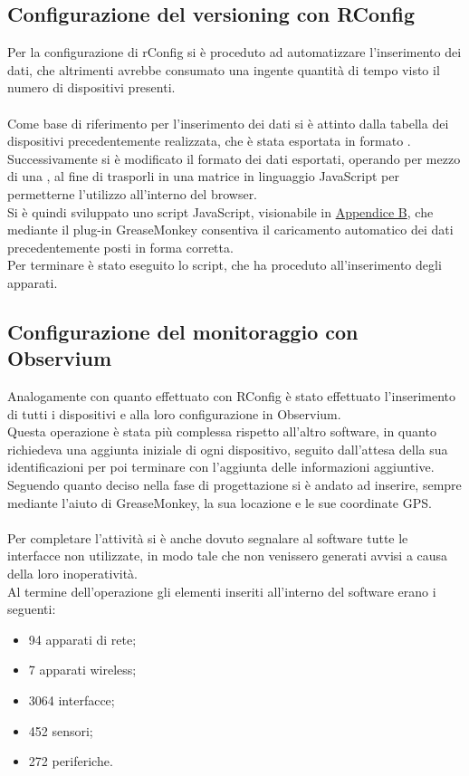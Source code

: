 \documentclass[Realizzazione.tex]{subfiles}
\begin{document}
\subsection{Configurazione del versioning con RConfig}
Per la configurazione di rConfig si è proceduto ad automatizzare l'inserimento dei dati, che altrimenti avrebbe consumato una ingente quantità di tempo visto il numero di dispositivi presenti. \\\\
Come base di riferimento per l'inserimento dei dati si è attinto dalla tabella dei dispositivi precedentemente realizzata, che è stata esportata in formato .\\
Successivamente si è modificato il formato dei dati esportati, operando per mezzo di una , al fine di trasporli in una matrice in linguaggio JavaScript per permetterne l'utilizzo all'interno del browser. \\
Si è quindi sviluppato uno script JavaScript, visionabile in \hyperref[sec:Appendice B]{Appendice B}, che mediante il plug-in GreaseMonkey consentiva il caricamento automatico dei dati precedentemente posti in forma corretta. \\
Per terminare è stato eseguito lo script, che ha proceduto all'inserimento degli apparati. \\


\subsection{Configurazione del monitoraggio con Observium}
Analogamente con quanto effettuato con RConfig è stato effettuato l'inserimento di tutti i dispositivi e alla loro configurazione in Observium. \\
Questa operazione è stata più complessa rispetto all'altro software, in quanto richiedeva una aggiunta iniziale di ogni dispositivo, seguito dall'attesa della sua identificazioni per poi terminare con l'aggiunta delle informazioni aggiuntive. Seguendo quanto deciso nella fase di progettazione si è andato ad inserire, sempre mediante l'aiuto di GreaseMonkey, la sua locazione e le sue coordinate GPS. \\\\
Per completare l'attività si è anche dovuto segnalare al software tutte le interfacce non utilizzate, in modo tale che non venissero generati avvisi a causa della loro inoperatività.\\

Al termine dell'operazione gli elementi inseriti all'interno del software erano i seguenti:
\begin{itemize}
	\item 94 apparati di rete;
	\item 7 apparati wireless;
	\item 3064 interfacce;
	\item 452 sensori;
	\item 272 periferiche.
\end{itemize}
\end{document}
